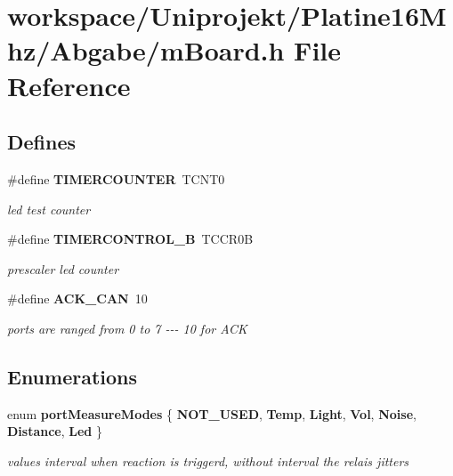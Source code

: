 \section{workspace/\-Uniprojekt/\-Platine16\-Mhz/\-Abgabe/m\-Board.h \-File \-Reference}
\label{m_board_8h}
\subsection*{\-Defines}
\begin{DoxyCompactItemize}
\item 
\#define {\bf \-T\-I\-M\-E\-R\-C\-O\-U\-N\-T\-E\-R}~\-T\-C\-N\-T0\label{group__main_ga1a329b3e30dfee7d342abb5ca42627c1}

\begin{DoxyCompactList}\small\item\em led test counter \end{DoxyCompactList}\item 
\#define {\bf \-T\-I\-M\-E\-R\-C\-O\-N\-T\-R\-O\-L\-\_\-\-B}~\-T\-C\-C\-R0\-B\label{group__main_ga92b6fba9f92d06d079d00bd6df3176d9}

\begin{DoxyCompactList}\small\item\em prescaler led counter \end{DoxyCompactList}\item 
\#define {\bf \-A\-C\-K\-\_\-\-C\-A\-N}~10\label{group__main_gaa267303b3341b8fb4d5229ef059d6c4b}

\begin{DoxyCompactList}\small\item\em ports are ranged from 0 to 7 -\/-\/-\/ 10 for \-A\-C\-K \end{DoxyCompactList}\end{DoxyCompactItemize}
\subsection*{\-Enumerations}
\begin{DoxyCompactItemize}
\item 
enum {\bf port\-Measure\-Modes} \{ \*
{\bfseries \-N\-O\-T\-\_\-\-U\-S\-E\-D}, 
{\bfseries \-Temp}, 
{\bfseries \-Light}, 
{\bfseries \-Vol}, 
\*
{\bfseries \-Noise}, 
{\bfseries \-Distance}, 
{\bfseries \-Led}
 \}
\begin{DoxyCompactList}\small\item\em values interval when reaction is triggerd, without interval the relais jitters \end{DoxyCompactList}\end{DoxyCompactItemize}
